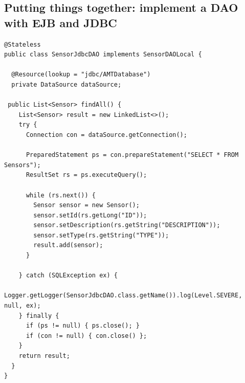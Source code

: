\subsection{Putting things together: implement a DAO with EJB and JDBC}

\vspace{10pt}
\begin{minipage}{\linewidth}
\begin{lstlisting}[frame=single]
@Stateless
public class SensorJdbcDAO implements SensorDAOLocal {

  @Resource(lookup = "jdbc/AMTDatabase")
  private DataSource dataSource;

 public List<Sensor> findAll() {
    List<Sensor> result = new LinkedList<>();
    try {
      Connection con = dataSource.getConnection();

      PreparedStatement ps = con.prepareStatement("SELECT * FROM Sensors");
      ResultSet rs = ps.executeQuery();

      while (rs.next()) {
        Sensor sensor = new Sensor();
        sensor.setId(rs.getLong("ID"));
        sensor.setDescription(rs.getString("DESCRIPTION"));
        sensor.setType(rs.getString("TYPE"));
        result.add(sensor);
      }

    } catch (SQLException ex) {
      Logger.getLogger(SensorJdbcDAO.class.getName()).log(Level.SEVERE, null, ex);
    } finally {
      if (ps != null) { ps.close(); }
      if (con != null) { con.close() };
    }
    return result;
  }
}
\end{lstlisting}
\end{minipage}

